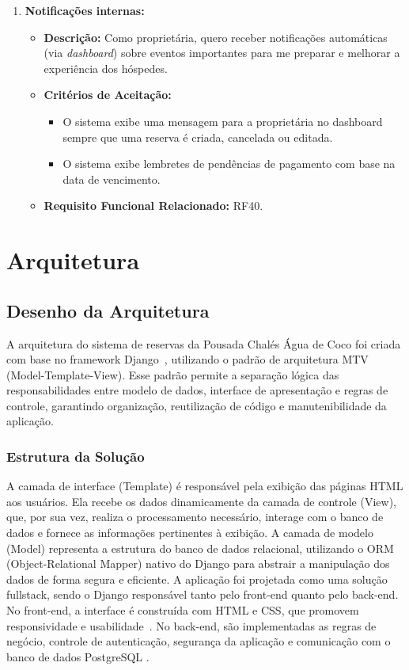 \documentclass[
	12pt,				%
	openany,			%
	twoside,			%
	a4paper,			%
	english,			%
	french,				%
	spanish,			%
	brazil				%
	]{abntex2}
\begin{document}
\begin{enumerate}[label=\textbf{\arabic*.}]
	  \item \textbf{Notificações internas:}
	 \begin{itemize}
	 	\item \textbf{Descrição:} Como proprietária, quero receber notificações automáticas (via \textit{dashboard}) sobre eventos importantes para me preparar e melhorar a experiência dos hóspedes.
	 	\item \textbf{Critérios de Aceitação:}
	 	\begin{itemize}
	 		\item O sistema exibe uma mensagem para a proprietária no dashboard sempre que uma reserva é criada, cancelada ou editada.
	 		\item O sistema exibe lembretes de pendências de pagamento com base na data de vencimento.
	 	\end{itemize}
	 	\item \textbf{Requisito Funcional Relacionado:} RF40.
	 \end{itemize} 
		\end{enumerate}
\section{Arquitetura}
\subsection{Desenho da Arquitetura}
A arquitetura do sistema de reservas da Pousada Chalés Água de Coco foi criada com base no framework Django~\cite{django}, utilizando o padrão de arquitetura MTV (Model-Template-View). Esse padrão permite a separação lógica das responsabilidades entre modelo de dados, interface de apresentação e regras de controle, garantindo organização, reutilização de código e manutenibilidade da aplicação.

\subsubsection{Estrutura da Solução}

A camada de interface (Template) é responsável pela exibição das páginas HTML aos usuários. Ela recebe os dados dinamicamente da camada de controle (View), que, por sua vez, realiza o processamento necessário, interage com o banco de dados e fornece as informações pertinentes à exibição. A camada de modelo (Model) representa a estrutura do banco de dados relacional, utilizando o ORM (Object-Relational Mapper) nativo do Django para abstrair a manipulação dos dados de forma segura e eficiente.
A aplicação foi projetada como uma solução fullstack, sendo o Django responsável tanto pelo front-end quanto pelo back-end. No front-end, a interface é construída com HTML e CSS, que promovem responsividade e usabilidade~\cite{duckett}. No back-end, são implementadas as regras de negócio, controle de autenticação, segurança da aplicação e comunicação com o banco de dados PostgreSQL
.
\end{document}
